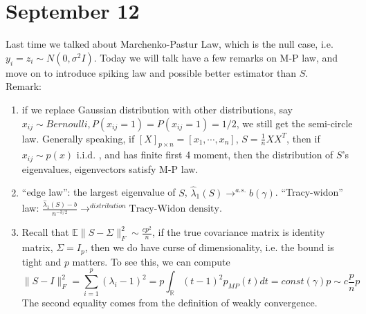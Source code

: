 \documentclass[12pt]{article}
\theoremstyle{plain}
\begin{document}
\part*{September 12}
Last time we talked about Marchenko-Pastur Law, which is the null case, i.e. $y_i=z_i \sim N(0,\sigma^2 I)$. Today we will talk have a few remarks on M-P law, and move on to introduce spiking law and possible better estimator than $S$. \\
Remark:
\begin{enumerate}
\item if we replace Gaussian distribution with other distributions, say $x_{ij} \sim Bernoulli, P(x_{ij} = 1) = P(x_{ij} = 1) = 1/2$, we still get the semi-circle law. Generally speaking, if $[X]_{p \times n} = [x_1, \cdots, x_n] $, $S = \frac{1}{n}XX^T$, then if $x_{ij} \sim p(x)$ i.i.d. , and has finite first 4 moment, then the distribution of $S$'s eigenvalues, eigenvectors satisfy M-P law.
\item ``edge law'': the largest eigenvalue of $S$, $\hat{\lambda}_1(S) \rightarrow^{a.s.} b(\gamma)$. ``Tracy-widon'' law: $\frac{\hat{\lambda}_1(S) -b}{n^{-3/2}} \rightarrow^{distribution} \text{Tracy-Widon density}$. 
\item Recall that $\mathbb{E}\|S-\Sigma\|^2_F \sim \frac{cp^2}{n}$, if the true covariance matrix is identity matrix, $\Sigma = I_p$, then we do have curse of dimensionality, i.e. the bound is tight and $p$ matters. To see this, we can compute
$$\|S-I\|^2_F = \sum_{i=1}^p (\lambda_i - 1)^2 = p \int_{\mathbb{R}} (t-1)^2 p_{MP}(t)dt = const(\gamma) p \sim c\frac{p}{n}p$$
The second equality comes from the definition of weakly convergence.
\end{enumerate}
\end{document}
